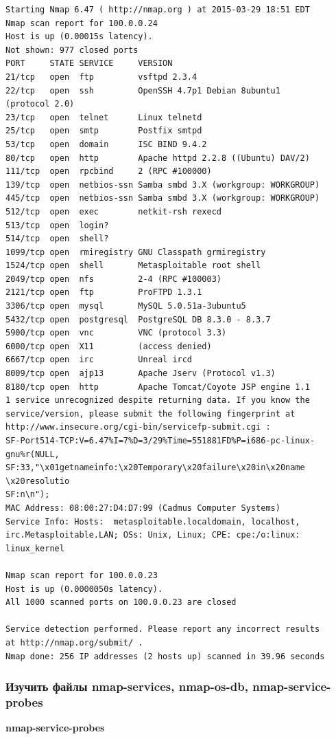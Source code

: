 \documentclass[12pt,a4paper]{article}
\begin{document}
\begin{lstlisting}
Starting Nmap 6.47 ( http://nmap.org ) at 2015-03-29 18:51 EDT
Nmap scan report for 100.0.0.24
Host is up (0.00015s latency).
Not shown: 977 closed ports
PORT     STATE SERVICE     VERSION
21/tcp   open  ftp         vsftpd 2.3.4
22/tcp   open  ssh         OpenSSH 4.7p1 Debian 8ubuntu1
(protocol 2.0)
23/tcp   open  telnet      Linux telnetd
25/tcp   open  smtp        Postfix smtpd
53/tcp   open  domain      ISC BIND 9.4.2
80/tcp   open  http        Apache httpd 2.2.8 ((Ubuntu) DAV/2)
111/tcp  open  rpcbind     2 (RPC #100000)
139/tcp  open  netbios-ssn Samba smbd 3.X (workgroup: WORKGROUP)
445/tcp  open  netbios-ssn Samba smbd 3.X (workgroup: WORKGROUP)
512/tcp  open  exec        netkit-rsh rexecd
513/tcp  open  login?
514/tcp  open  shell?
1099/tcp open  rmiregistry GNU Classpath grmiregistry
1524/tcp open  shell       Metasploitable root shell
2049/tcp open  nfs         2-4 (RPC #100003)
2121/tcp open  ftp         ProFTPD 1.3.1
3306/tcp open  mysql       MySQL 5.0.51a-3ubuntu5
5432/tcp open  postgresql  PostgreSQL DB 8.3.0 - 8.3.7
5900/tcp open  vnc         VNC (protocol 3.3)
6000/tcp open  X11         (access denied)
6667/tcp open  irc         Unreal ircd
8009/tcp open  ajp13       Apache Jserv (Protocol v1.3)
8180/tcp open  http        Apache Tomcat/Coyote JSP engine 1.1
1 service unrecognized despite returning data. If you know the
service/version, please submit the following fingerprint at
http://www.insecure.org/cgi-bin/servicefp-submit.cgi :
SF-Port514-TCP:V=6.47%I=7%D=3/29%Time=551881FD%P=i686-pc-linux-
gnu%r(NULL,
SF:33,"\x01getnameinfo:\x20Temporary\x20failure\x20in\x20name
\x20resolutio
SF:n\n");
MAC Address: 08:00:27:D4:D7:99 (Cadmus Computer Systems)
Service Info: Hosts:  metasploitable.localdomain, localhost,
irc.Metasploitable.LAN; OSs: Unix, Linux; CPE: cpe:/o:linux:
linux_kernel

Nmap scan report for 100.0.0.23
Host is up (0.0000050s latency).
All 1000 scanned ports on 100.0.0.23 are closed

Service detection performed. Please report any incorrect results
at http://nmap.org/submit/ .
Nmap done: 256 IP addresses (2 hosts up) scanned in 39.96 seconds
\end{lstlisting}
\newpage
\subsubsection{Изучить файлы nmap-services, nmap-os-db, nmap-service-probes}

\textbf{nmap-service-probes}
\end{document}
